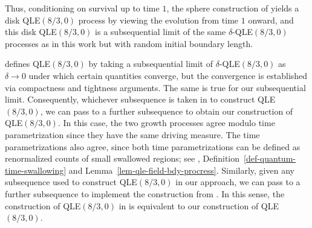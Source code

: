 \documentclass[a4paper]{article}
\numberwithin{equation}{section}
\theoremstyle{remark}
\numberwithin{equation}{section}
\begin{document}
Thus, conditioning on survival up to time $1$, the sphere construction of \cite{ms-equivalence} yields a disk QLE$(8/3,0)$ process by viewing the evolution from time $1$ onward, and this disk QLE$(8/3,0)$ is a subsequential limit of the same $\delta$-QLE$(8/3,0)$ processes as in this work but with random initial boundary length.


\cite{ms-equivalence} defines  QLE$(8/3,0)$ by taking a subsequential limit of $\delta$-QLE$(8/3,0)$ as $\delta \to 0$ under which certain quantities converge, but the convergence is established via compactness and tightness arguments. The same is true for our subsequential limit. Consequently, whichever subsequence is taken in \cite{ms-equivalence} to construct QLE$(8/3,0)$, we can pass to a further subsequence to obtain our construction of QLE$(8/3,0)$. In this case, the two growth processes agree modulo time parametrization since they have the same driving measure. The time parametrizations also agree, since both time parametrizations can be defined as renormalized counts of small swallowed regions; see  \cite[Remark 6.4]{ms-equivalence}, Definition~\ref{def-quantum-time-swallowing} and Lemma~\ref{lem-qle-field-bdy-procress}. Similarly, given any subsequence used to construct QLE$(8/3,0)$ in our approach, we can pass to a further subsequence to implement the construction from \cite{ms-equivalence}. In this sense, the construction of QLE$(8/3,0)$ in  \cite{ms-equivalence} is equivalent to our construction of QLE$(8/3,0)$. 





\end{document}
